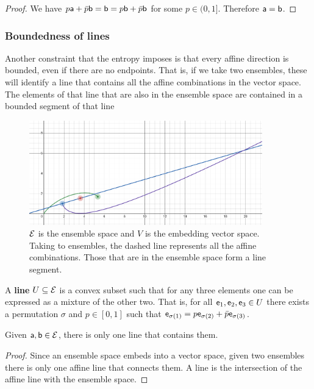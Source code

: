 \begin{proof}
	We have $p\ens[a] + \bar{p} \ens[b] = \ens[b] = p\ens[b] + \bar{p} \ens[b]$ for some $p \in (0,1]$. Therefore $\ens[a] = \ens[b]$.
\end{proof}

\subsubsection{Boundedness of lines}

Another constraint that the entropy imposes is that every affine direction is bounded, even if there are no endpoints. That is, if we take two ensembles, these will identify a line that contains all the affine combinations in the vector space. The elements of that line that are also in the ensemble space are contained in a bounded segment of that line

\begin{figure}[h]
	\centering
	\includegraphics[width=0.9\textwidth]{tempimages/BoundsFromEntropy.png}
	\caption{$\Ens$ is the ensemble space and $V$ is the embedding vector space. Taking to ensembles, the dashed line represents all the affine combinations. Those that are in the ensemble space form a line segment.}
\end{figure}

\begin{defn}
	A \textbf{line} $U \subseteq \Ens$ is a convex subset such that for any three elements one can be expressed as a mixture of the other two. That is, for all $\ens_1, \ens_2, \ens_3 \in U$ there exists a permutation $\sigma$ and $p \in [0,1]$ such that $\ens_{\sigma(1)} = p \ens_{\sigma(2)} + \bar{p} \ens_{\sigma(3)}	$.
\end{defn}

\begin{prop}
	Given $\ens[a], \ens[b] \in \Ens$, there is only one line that contains them.
\end{prop}

\begin{proof}
	Since an ensemble space embeds into a vector space, given two ensembles there is only one affine line that connects them. A line is the intersection of the affine line with the ensemble space.
\end{proof}

